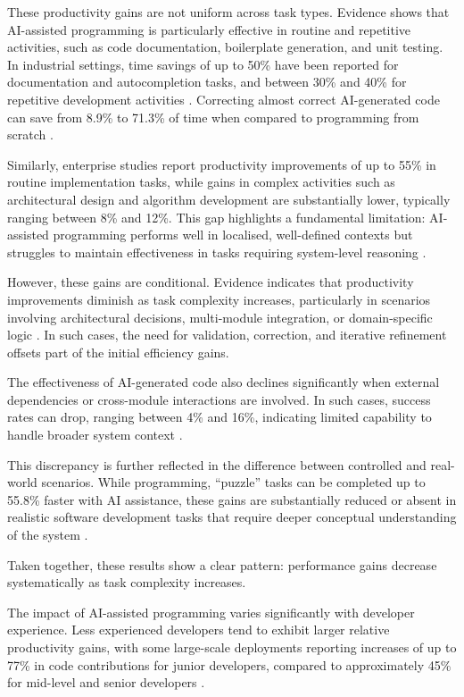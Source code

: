\documentclass[conference]{IEEEtran}
\begin{document}
These productivity gains are not uniform across task types. Evidence shows that AI-assisted programming is particularly effective in routine and repetitive activities, such as code documentation, boilerplate generation, and unit testing. In industrial settings, time savings of up to 50\% have been reported for documentation and autocompletion tasks, and between 30\% and 40\% for repetitive development activities \cite{pandey_transforming_2024}. Correcting almost correct AI-generated code can save from 8.9\% to 71.3\% of time when compared to programming from scratch \cite{idrisov_program_2024}.

Similarly, enterprise studies report productivity improvements of up to 55\% in routine implementation tasks, while gains in complex activities such as architectural design and algorithm development are substantially lower, typically ranging between 8\% and 12\%. This gap highlights a fundamental limitation: AI-assisted programming performs well in localised, well-defined contexts but struggles to maintain effectiveness in tasks requiring system-level reasoning \cite{koripalli_copilot_2025}.

However, these gains are conditional. Evidence indicates that productivity improvements diminish as task complexity increases, particularly in scenarios involving architectural decisions, multi-module integration, or domain-specific logic \cite{rasnayaka_empirical_2024, koripalli_copilot_2025}. In such cases, the need for validation, correction, and iterative refinement offsets part of the initial efficiency gains.

The effectiveness of AI-generated code also declines significantly when external dependencies or cross-module interactions are involved. In such cases, success rates can drop, ranging between 4\% and 16\%, indicating limited capability to handle broader system context \cite{corso_generating_2024}.

This discrepancy is further reflected in the difference between controlled and real-world scenarios. While programming, ``puzzle'' tasks can be completed up to 55.8\% faster with AI assistance, these gains are substantially reduced or absent in realistic software development tasks that require deeper conceptual understanding of the system \cite{xu_ai-assisted_2026, wang_rocks_2024}.

Taken together, these results show a clear pattern: performance gains decrease systematically as task complexity increases.

The impact of AI-assisted programming varies significantly with developer experience. Less experienced developers tend to exhibit larger relative productivity gains, with some large-scale deployments reporting increases of up to 77\% in code contributions for junior developers, compared to approximately 45\% for mid-level and senior developers \cite{kumar_intuition_2025}.
\end{document}

